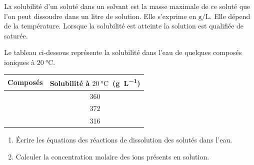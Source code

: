 La solubilité d'un soluté dans un solvant est la masse maximale de ce soluté que
l'on peut dissoudre dans un litre de solution. Elle s'exprime en
$\unit{\g\per\L}$. Elle dépend de la température. Lorsque la solubilité est
atteinte la solution est qualifiée de saturée.

Le tableau ci-dessous représente la solubilité dans l'eau de quelques composés
ioniques à $\qty{20}{\degreeCelsius}$.

\begin{minipage}{\linewidth}
    \begin{table}[H]
    \centering
    \setlength{\arrayrulewidth}{0.8pt}
    \renewcommand{\arraystretch}{1.5}
    \begin{tabularx}{\textwidth}{|C|C|}
        \hline
        Composés & Solubilité à $\qty{20}{\degreeCelsius}$~(\unit{\g\per\L}) \\
        \hline
         & 360 \\
        \hline
         & 372 \\
        \hline
         & 316 \\
        \hline
    \end{tabularx}
\end{table}
\end{minipage}

\begin{enumerate}
    \item Écrire les équations des réactions de dissolution des solutés dans
          l'eau.
    \item Calculer la concentration molaire des ions présents en solution.
\end{enumerate}

